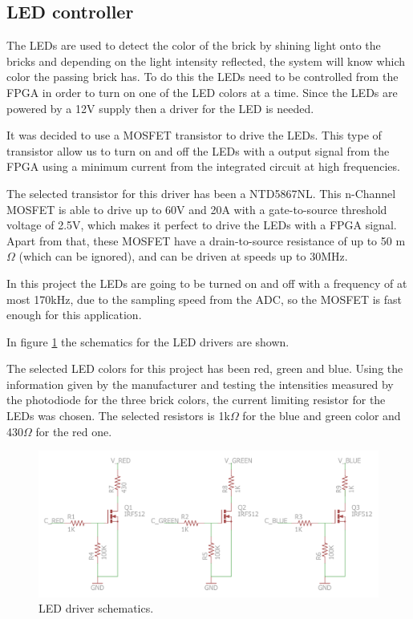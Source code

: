 

\subsection{LED controller}
The LEDs are used to detect the color of the brick by shining light onto the bricks and depending on the light intensity reflected, the system will know which color the passing brick has.
To do this the LEDs need to be controlled from the FPGA in order to turn on one of the LED colors at a time.
Since the LEDs are powered by a 12V supply then a driver for the LED is needed. 

It was decided to use a MOSFET transistor to drive the LEDs. 
This type of transistor allow us to turn on and off the LEDs with a output signal from the FPGA using a minimum current from the integrated circuit at high frequencies.

The selected transistor for this driver has been a NTD5867NL. 
This n-Channel MOSFET is able to drive up to 60V and 20A with a gate-to-source threshold voltage of 2.5V, which makes it perfect to drive the LEDs with a FPGA signal.
Apart from that, these MOSFET have a drain-to-source resistance of up to 50 m$\Omega$ (which can be ignored), and can be driven at speeds up to 30MHz.

In this project the LEDs are going to be turned on and off with a frequency of at most 170kHz, due to the sampling speed from the ADC, so the MOSFET is fast enough for this application.

In figure \ref{fig:LED_driver_sch} the schematics for the LED drivers are shown.

The selected LED colors for this project has been red, green and blue. 
Using the information given by the manufacturer and testing the intensities measured by the photodiode for the three brick colors, the current limiting resistor for the LEDs was chosen. 
The selected resistors is 1k$\Omega$ for the blue and green color and 430$\Omega$ for the red one.

\begin{figure}[H]
\centering 
\includegraphics[width = 0.7 \textwidth]{images/leddriver_schematics}
\caption{LED driver schematics.}
\label{fig:LED_driver_sch}
\end{figure}


